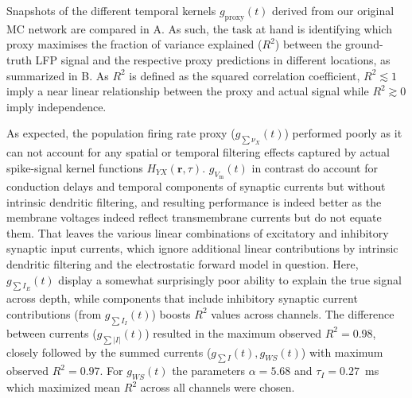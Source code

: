 Snapshots of the different temporal kernels $g_\text{proxy}(t)$ derived from our original MC network are compared in A.  
As such, the task at hand is identifying which proxy maximises the fraction of variance explained ($R^2$) between the  ground-truth LFP signal and the respective proxy predictions in different locations, 
as summarized in B. 
As $R^2$ is defined as the squared correlation coefficient, $R^2 \lesssim 1$ imply a near linear relationship between the proxy and actual signal while $R^2 \gtrsim 0$ imply independence.

As expected, the population firing rate proxy ($g_{\sum \nu_X}(t)$) performed poorly as it can not account for any spatial or temporal filtering effects captured by actual spike-signal kernel functions $H_{YX}(\mathbf{r}, \tau)$. 
$g_{V_\text{m}}(t)$ in contrast do account for conduction delays and
temporal components of synaptic currents but without intrinsic dendritic filtering, 
and resulting performance is indeed better as the membrane voltages indeed reflect transmembrane currents but do not equate them. 
That leaves the various linear combinations of excitatory and inhibitory synaptic input currents, 
which ignore additional linear contributions by intrinsic dendritic filtering and the electrostatic forward model in question. 
Here, $g_{\sum I_E}(t)$ display a somewhat surprisingly poor ability to explain the true signal across depth, 
while components that include inhibitory synaptic current contributions (from $g_{\sum I_I}(t)$) boosts $R^2$ values across channels. 
The difference between currents ($g_{\sum {|I|}}(t)$) resulted in the maximum observed $R^2 = 0.98$, 
closely followed by the summed currents ($g_{\sum {I}}(t), g_{WS}(t)$) with maximum observed $R^2 = 0.97$.
For $g_{WS}(t)$ the parameters $\alpha=5.68$ and $\tau_I=0.27$~\si{\milli\second} which maximized mean $R^2$ across all channels were chosen.

